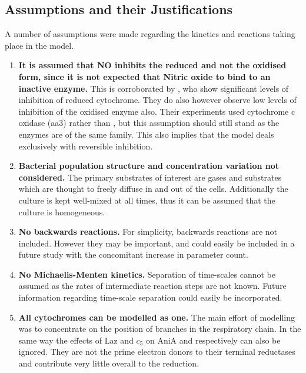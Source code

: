 \subsection{Assumptions and their Justifications}
A number of assumptions were made regarding the kinetics and reactions taking place in the model.
\begin{enumerate}
 \item {\bf It is assumed that NO inhibits the reduced \cbbthree{} and not the oxidised form, since it is not expected that Nitric oxide to bind to an inactive enzyme.} This is corroborated by \citet{Giuffre2000}, who show significant levels of inhibition of reduced cytochrome. They do also however observe low levels of inhibition of the oxidised enzyme also. Their experiments used cytochrome c oxidase (aa3) rather than \cbbthree{}, but this assumption should still stand as the enzymes are of the same family. This also implies that the model deals exclusively with reversible inhibition.
 \item {\bf Bacterial population structure and concentration variation not considered.} The primary substrates of interest are gases and substrates which are thought to freely diffuse in and out of the cells. Additionally the culture is kept well-mixed at all times, thus it can be assumed that the culture is homogeneous.
 \item {\bf No backwards reactions.} For simplicity, backwards reactions are not included. However they may be important, and could easily be included in a future study with the concomitant increase in parameter count.
 \item {\bf No Michaelis-Menten kinetics.} Separation of time-scales cannot be assumed as the rates of intermediate reaction steps are not known. Future information regarding time-scale separation could easily be incorporated.
 \item {\bf All cytochromes can be modelled as one.} The main effort of modelling was to concentrate on the position of branches in the respiratory chain. In the same way the effects of Laz and $c_5$ on AniA and \cbbthree{} respectively can also be ignored. They are not the prime electron donors to their terminal reductases and contribute very little overall to the reduction\cite{Deeudom2007}.
\end{enumerate}


